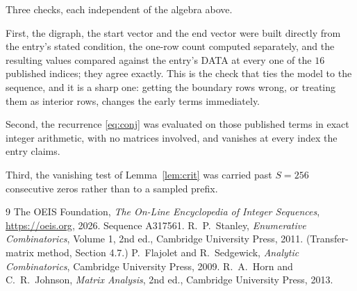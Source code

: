 \documentclass[11pt,a4paper]{article}
\theoremstyle{plain}
\theoremstyle{definition}
\begin{document}
Three checks, each independent of the algebra above.

First, the digraph, the start vector and the end vector were built directly from the
entry's stated condition, the one-row count computed separately, and the resulting values
compared against the entry's DATA at every one of the $16$ published indices; they
agree exactly. This is the check that ties the model to the sequence, and it is a sharp one:
getting the boundary rows wrong, or treating them as interior rows, changes the early terms
immediately.

Second, the recurrence \eqref{eq:conj} was evaluated on those published terms in exact
integer arithmetic, with no matrices involved, and vanishes at every index the entry claims.

Third, the vanishing test of Lemma~\ref{lem:crit} was carried past $S=256$ consecutive
zeros rather than to a sampled prefix.

\begin{thebibliography}{9}
 The OEIS Foundation, \emph{The On-Line Encyclopedia of Integer
Sequences}, \url{https://oeis.org}, 2026. Sequence A317561.
 R.~P.~Stanley, \emph{Enumerative Combinatorics}, Volume 1, 2nd ed.,
Cambridge University Press, 2011. (Transfer-matrix method, Section 4.7.)
 P.~Flajolet and R.~Sedgewick, \emph{Analytic Combinatorics}, Cambridge
University Press, 2009.
 R.~A.~Horn and C.~R.~Johnson, \emph{Matrix Analysis}, 2nd ed., Cambridge
University Press, 2013.
\end{thebibliography}
\end{document}
